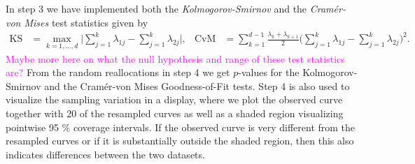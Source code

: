 \documentclass[titlepage,11pt,twoside]{article}
\newcommand{\hl}[1]{\textcolor{magenta}{#1}}
\begin{document}
In step 3 we have implemented both the \emph{Kolmogorov-Smirnov} and the \emph{Cram\'er-von Mises} test statistics given by
\begin{align*}
\text{KS} &= \max_{k=1,\dotsc,d} \bigg\lvert \sum_{j=1}^k \lambda_{1j} - \sum_{j=1}^k \lambda_{2j} \bigg\rvert, &
\text{CvM} &= \sum_{k=1}^{d-1} \frac{\lambda_k + \lambda_{k+1}}{2} \bigg( \sum_{j=1}^k \lambda_{1j} - \sum_{j=1}^k \lambda_{2j} \bigg)^2.
\end{align*}
\hl{Maybe more here on what the null hypothesis and range of these test statistics are?} 
From the random reallocations in step 4 we get $p$-values for the Kolmogorov-Smirnov and the Cram\'er-von Mises Goodness-of-Fit tests. Step 4 is also used to visualize the sampling variation in a display, where we plot the observed curve together with 20 of the resampled curves as well as a shaded region visualizing pointwise 95 \% coverage intervals. If the observed curve is very different from the resampled curves or if it is substantially outside the shaded region, then this also indicates differences between the two datasets.


\bigskip
\end{document}

